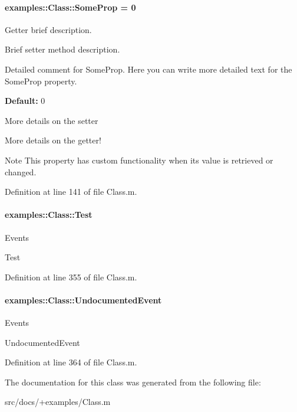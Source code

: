 \hypertarget{classexamples_1_1_class_ae3f0807afb99d8b3bc482712607653c7}{}
\paragraph[{Some\+Prop}]{\setlength{\rightskip}{0pt plus 5cm}examples\+::\+Class\+::\+Some\+Prop = 0}\label{classexamples_1_1_class_ae3f0807afb99d8b3bc482712607653c7}
Getter brief description.

Brief setter method description.

Detailed comment for Some\+Prop. Here you can write more detailed text for the Some\+Prop property.

{\bfseries Default\+:} 0

More details on the setter

More details on the getter!

\begin{DoxyNote}{Note}
This property has custom functionality when its value is retrieved or changed. 
\end{DoxyNote}


Definition at line 141 of file Class.\+m.

\hypertarget{classexamples_1_1_class_a4560097d207de0d55fc6448ae6c63497}{}
\paragraph[{Test}]{\setlength{\rightskip}{0pt plus 5cm}examples\+::\+Class\+::\+Test}\label{classexamples_1_1_class_a4560097d207de0d55fc6448ae6c63497}
\begin{DoxyRefDesc}{Events}
\item[\hyperlink{event__event000001}{Events}]Test \end{DoxyRefDesc}


Definition at line 355 of file Class.\+m.

\hypertarget{classexamples_1_1_class_a7e90a67bef80651ad156fd4853261ef4}{}
\paragraph[{Undocumented\+Event}]{\setlength{\rightskip}{0pt plus 5cm}examples\+::\+Class\+::\+Undocumented\+Event}\label{classexamples_1_1_class_a7e90a67bef80651ad156fd4853261ef4}
\begin{DoxyRefDesc}{Events}
\item[\hyperlink{event__event000002}{Events}]Undocumented\+Event \end{DoxyRefDesc}


Definition at line 364 of file Class.\+m.



The documentation for this class was generated from the following file\+:\begin{DoxyCompactItemize}
\item 
src/docs/+examples/Class.\+m\end{DoxyCompactItemize}
